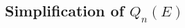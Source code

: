 \documentclass[12pt]{article}
\newtheorem{ddd}[theorem]{Definition}
\newcommand{\Z}{{\mathbb{Z}}}
\newcommand{\Q}{{\mathbb{Q}}}
\renewcommand{\lim}{{\tt lim}}
\begin{document}


\subsection{Simplification of $Q_{n}(E)$}\label{sec222}


\end{document}

